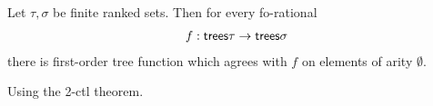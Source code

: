 \begin{lemma}
    Let $\tau,\sigma$ be finite ranked sets. Then for every fo-rational
    \begin{align*}
        f : \mathsf {trees} \tau \to \mathsf {trees} \sigma
    \end{align*}
    there is first-order tree function which agrees with $f$ on elements of arity $\emptyset$. 
\end{lemma}
\begin{pr}
    Using the 2-ctl theorem.
    \end{pr}


